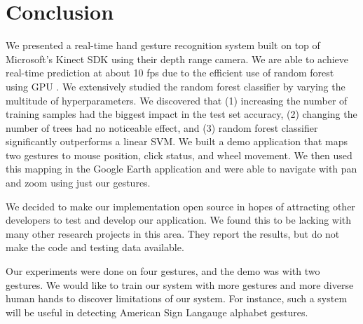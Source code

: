 \section{Conclusion}
\label{sec: conclusion}
\cutsection
We presented a real-time hand gesture recognition system built on top of Microsoft's Kinect SDK using their depth range camera. We are able to achieve real-time prediction at about 10 fps due to the efficient use of random forest using GPU . We extensively studied the random forest classifier by varying the multitude of hyperparameters. We discovered that (1) increasing the number of training samples had the biggest impact in the test set accuracy, (2) changing the number of trees had no noticeable effect, and (3) random forest classifier significantly outperforms a linear SVM. We built a demo application that maps two gestures to mouse position, click status, and wheel movement. We then used this mapping in the Google Earth application and were able to navigate with pan and zoom using just our gestures.

We decided to make our implementation open source in hopes of attracting other developers to test and develop our application. We found this to be lacking with many other research projects in this area. They report the results, but do not make the code and testing data available.

Our experiments were done on four gestures, and the demo was with two gestures. We would like to train our system with more gestures and more diverse human hands to discover limitations of our system. For instance, such a system will be useful in detecting American Sign Langauge alphabet gestures.